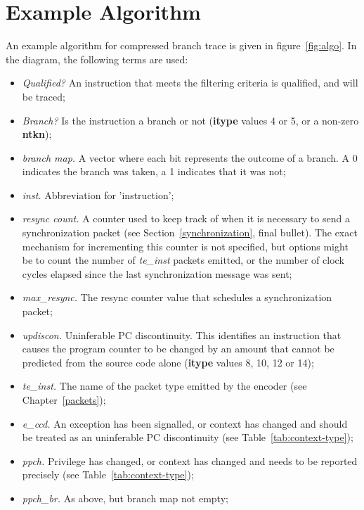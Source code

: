 \chapter{Example Algorithm} \label{Algorithm}

An example algorithm for compressed branch trace is given in figure~\ref{fig:algo}. 
In the diagram, the following terms are used:

\begin{itemize}
  \item \textit{Qualified?}  An instruction that meets the filtering criteria is qualified, and will be traced;
  \item \textit{Branch?} Is the instruction a branch or not (\textbf{itype} values 4 or 5, or a non-zero \textbf{ntkn});
  \item \textit{branch map.}  A vector where each bit represents the outcome of a branch.  A 0 indicates the
    branch was taken, a 1 indicates that it was not;
  \item \textit{inst.}  Abbreviation for 'instruction';
  \item \textit{resync count.} A counter used to keep track of when it is necessary to send 
    a synchronization packet (see Section~\ref{synchronization}, final bullet). The exact mechanism for 
    incrementing this counter is not specified, but options might be to count the number of \textit{te\_inst} packets emitted, 
    or the number of clock cycles elapsed since the last synchronization message was sent;
  \item \textit{max\_resync.}  The resync counter value that schedules a synchronization packet;
  \item \textit{updiscon.}  Uninferable PC discontinuity.  This identifies an instruction that
    causes the program counter to be changed by an amount that cannot be predicted from the
    source code alone (\textbf{itype} values 8, 10, 12 or 14);
   \item \textit{te\_inst.} The name of the packet type emitted by the encoder (see Chapter~\ref{packets});
   \item \textit{e\_ccd.} An exception has been signalled, or context has changed and
     should be treated as an uninferable PC discontinuity (see Table~\ref{tab:context-type});
   \item \textit{ppch.} Privilege has changed, or context has changed and needs to be 
     reported precisely (see Table~\ref{tab:context-type});
   \item \textit{ppch\_br.} As above, but branch map not empty;

\end{itemize}
